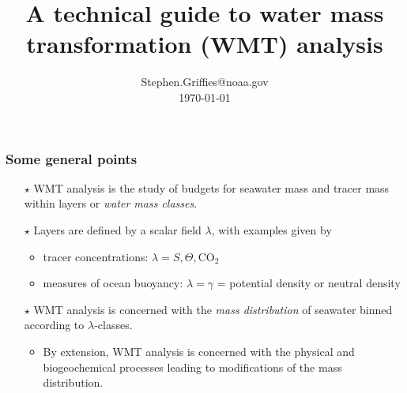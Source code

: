 \documentclass[10pt]{beamer}
\title[WMT Theory and Practice]{A technical guide to water mass transformation (WMT) analysis} %
\author[{\sc
  Stephen.M.Griffies@gmail.com}]{ {\sc Stephen.Griffies@noaa.gov} 
 \\ \vspace{.3cm} {\small  \today}
}
\institute[NOAA/GFDL + Princeton University]{NOAA/GFDL + Princeton University}
\date{}
\begin{document}

  
\begin{frame}
  \titlepage
\end{frame}






\begin{frame}
  \frametitle{Some general points}
\scriptsize 

\begin{exampleblock}{}
  
  \begin{itemize}
    
  \item[$\star$] WMT analysis is the study of budgets for seawater
    mass and tracer mass within layers or {\it water mass classes}.

  \item[$\star$] Layers are defined by a scalar field $\lambda$, with examples given by 
    \begin{itemize}
      \scriptsize 
     \item tracer concentrations: $\lambda = S, \Theta, \mbox{CO}_{2}$ 
     \item measures of ocean buoyancy: $\lambda = \gamma$ = potential density or neutral density 
    \end{itemize}
  
  \item[$\star$] WMT analysis is concerned with the {\it mass
      distribution} of seawater binned according to $\lambda$-classes.
\begin{itemize}
      \scriptsize 
    \item By extension, WMT analysis is concerned with the physical
      and biogeochemical processes leading to modifications of the
      mass distribution.
    \end{itemize}


\end{itemize}
\end{exampleblock}
\end{frame}
\end{document}
